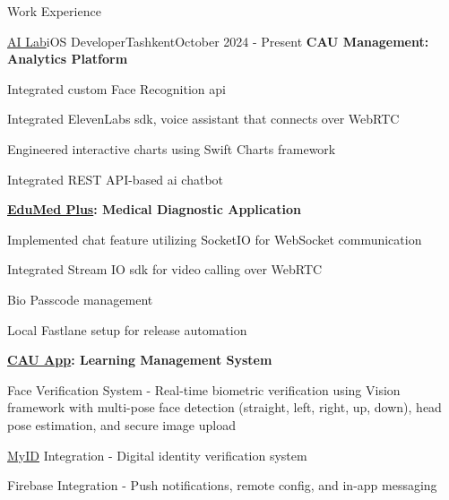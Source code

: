 \begin{resume_section}{Work Experience}

\begin{resume_employer}{\href{https://www.linkedin.com/company/ai-lab-centralasian}{AI Lab}}{iOS Developer}{Tashkent}{October 2024 - Present}
\textbf{CAU Management: Analytics Platform}
\item 
\item Integrated custom Face Recognition api
\item Integrated ElevenLabs sdk, voice assistant that connects over WebRTC
\item Engineered interactive charts using Swift Charts framework
\item Integrated REST API-based ai chatbot

\vspace{\projectspacing}

\textbf{\href{https://apps.apple.com/uz/app/edumed-plus/id6757598366}{EduMed Plus}: Medical Diagnostic Application}
\item Implemented chat feature utilizing SocketIO for WebSocket communication
\item Integrated Stream IO sdk for video calling over WebRTC
\item Bio Passcode management
\item Local Fastlane setup for release automation   

\vspace{\projectspacing}

\textbf{\href{https://apps.apple.com/uz/app/eduplus-cau/id6670467558}{CAU App}: Learning Management System}
\item Face Verification System - Real-time biometric verification using Vision framework with multi-pose face detection (straight, left, right, up, down), head pose estimation, and secure image upload
\item \href{https://docs.myid.uz/#/en/sdknew}{MyID} Integration - Digital identity verification system 
\item  Firebase Integration - Push notifications, remote config, and in-app messaging


\end{resume_employer}
\end{resume_section}
